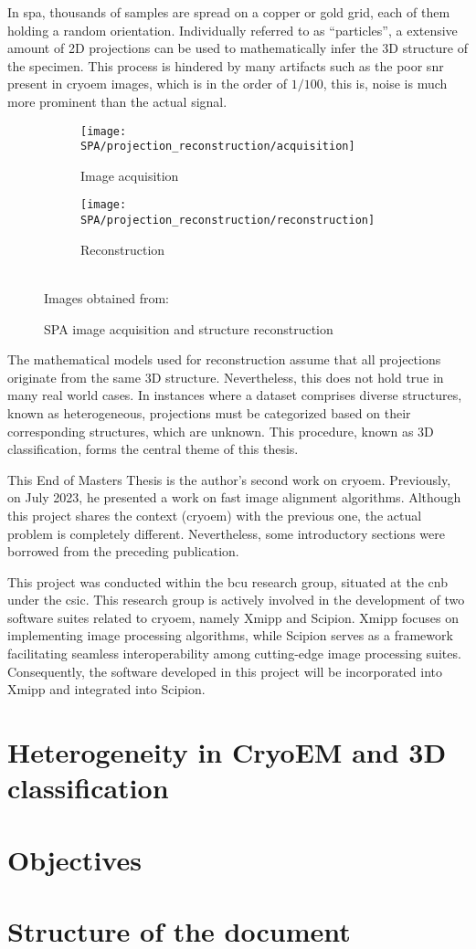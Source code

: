 \documentclass[../main.tex]{subfiles}
\begin{document}
In \gls{spa}, thousands of samples are spread on a copper or gold grid, each of them holding a random orientation. Individually referred to as ``particles'', a extensive amount of 2D projections can be used to mathematically infer the 3D structure of the specimen\cite{cryoem101}. This process is hindered by many artifacts such as the poor \gls{snr} present in \gls{cryoem} images, which is in the order of $1/100$, this is, noise is much more prominent than the actual signal.

\begin{figure}[hbp]
    \centering
    \begin{subfigure}[b]{0.45\textwidth}
         \centering
         \texttt{[image: SPA/projection\_reconstruction/acquisition]}
         \caption{Image acquisition}
    \end{subfigure}
    \hfill
    \begin{subfigure}[b]{0.45\textwidth}
         \centering
         \texttt{[image: SPA/projection\_reconstruction/reconstruction]}
         \caption{Reconstruction}
    \end{subfigure}\\
    Images obtained from: \cite{greg}
    \caption{SPA image acquisition and structure reconstruction}
    \label{fig:1:acquisition_reconstruction}
\end{figure}

The mathematical models used for reconstruction assume that all projections originate from the same 3D structure. Nevertheless, this does not hold true in many real world cases. In instances where a dataset comprises diverse structures, known as heterogeneous, projections must be categorized based on their corresponding structures, which are unknown. This procedure, known as 3D classification, forms the central theme of this thesis.

This End of Masters Thesis is the author's second work on \gls{cryoem}. Previously, on July 2023, he presented a work on fast image alignment algorithms\cite{zarrabeitia2023}. Although this project shares the context (\gls{cryoem}) with the previous one, the actual problem is completely different. Nevertheless, some introductory sections were borrowed from the preceding publication.

This project was conducted within the \gls{bcu} research group, situated at the \gls{cnb} under the \gls{csic}. This research group is actively involved in the development of two software suites related to \gls{cryoem}, namely Xmipp and Scipion. Xmipp focuses on implementing image processing algorithms, while Scipion serves as a framework facilitating seamless interoperability among cutting-edge image processing suites. Consequently, the software developed in this project will be incorporated into Xmipp and integrated into Scipion.

\section{Heterogeneity in CryoEM and 3D classification}


\section{Objectives}


\section{Structure of the document}

\end{document}
